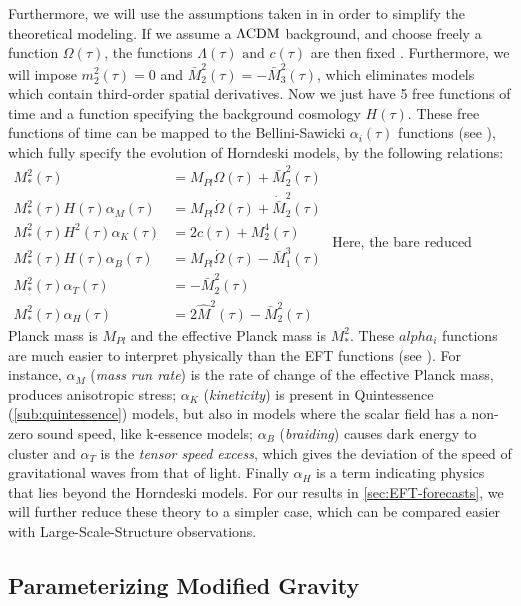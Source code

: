 Furthermore, we will use the assumptions taken in \cite{planck_collaboration_planck_2016} in order to simplify
the theoretical modeling.
If we assume a $\Lambda\mathrm{CDM}$ background, and choose freely a function
$\Omega(\tau)$, the functions $\Lambda(\tau) \textrm{ and } c(\tau)$ are then fixed \cite{cite Hu 2014}.
Furthermore, we will impose $ m^2_2(\tau) = 0$ and $ \bar{M}_2^2 (\tau) = - \bar{M}_3^2 (\tau)$,
which eliminates models which contain third-order spatial derivatives.
Now we just have 5 free functions of time and a function specifying the background cosmology $H(\tau)$.
These free functions of time can be mapped to the Bellini-Sawicki $\alpha_i (\tau)$ 
functions (see \cite{bellini-sawicki}),
which fully specify the evolution of Horndeski models, by the following relations:
\beeqal$
\begin{split}
M_{*}^2 (\tau) & = M_{Pl}\Omega(\tau) + \bar{M}_2^2 (\tau) \\
M_{*}^2 (\tau) H(\tau) \alpha_M (\tau)   & = M_{Pl}\dot{\Omega}(\tau) + \dot{\bar{M}}_2^2 (\tau) \\
M_{*}^2 (\tau) H^2(\tau) \alpha_K (\tau)   & = 2 c (\tau) + M_2^4 (\tau) \\
M_{*}^2 (\tau) H(\tau) \alpha_B (\tau)   & = M_{Pl}\dot{\Omega}(\tau) - \bar{M}_{1}^3 (\tau)\\
M_{*}^2 (\tau) \alpha_T (\tau)   & = - \bar{M}_2^2 (\tau) \\
M_{*}^2 (\tau) \alpha_H (\tau)   & = 2 \hat{M}^2(\tau) - \bar{M}_2^2 (\tau)
\end{split}
$ 
Here, the bare reduced Planck mass is $M_{Pl}$ and the effective Planck mass is $ M_{*}^2 $.
These $alpha_i$ functions are much easier to interpret physically than the EFT functions (see \cite{bellini, sawicki}).
For instance, $\alpha_M$ (\emph{mass run rate}) is the rate of change of the effective Planck mass, 
produces anisotropic stress; $\alpha_K$ (\emph{kineticity}) is present in Quintessence (\cref{sub:quintessence}) models, 
but also in models where the scalar field has a non-zero sound speed, like k-essence models;
$\alpha_B$ (\emph{braiding}) causes dark energy to cluster and $\alpha_T$ is the \emph{tensor speed excess}, which gives the deviation
of the speed of gravitational waves from that of light.
Finally $\alpha_H$ is a term indicating physics that lies beyond the Horndeski models. 
For our results in \cref{sec:EFT-forecasts}, we will further reduce these theory to a simpler case, 
which can be compared easier with Large-Scale-Structure observations.


\subsection{Parameterizing Modified Gravity}

